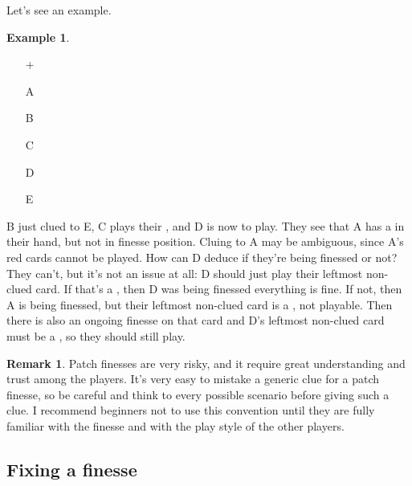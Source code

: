 \documentclass[a4paper]{article}
\theoremstyle{plain}
\theoremstyle{definition}
\newtheorem{remark}[theorem]{Remark}
\newtheorem{example}[theorem]{Example}
\begin{document}
Let's see an example.

\begin{example}	\hfill \\
	\begin{minipage}{0.45\textwidth}
		\begin{itemize}
			\item[\Large +]      
			\item[\Large A]    
			\item[\Large B]    
			\item[\Large C]    
			\item[\Large D]    
			\item[\Large E]    
		\end{itemize}
	\end{minipage}%
	\begin{minipage}{0.55\textwidth}
		B just clued  to E, C plays their , and D is now to play. They see that A has a  in their hand, but not in finesse position. Cluing  to A may be ambiguous, since A's red cards cannot be played. How can D deduce if they're being finessed or not? They can't, but it's not an issue at all: D should just play their leftmost non-clued card. If that's a , then D was being finessed everything is fine. If not, then A is being finessed, but their leftmost non-clued card is a , not playable. Then there is also an ongoing finesse on that card and D's leftmost non-clued card must be a , so they should still play.	
	\end{minipage}
\end{example} \vspace{0.15 cm}

\begin{remark}
	Patch finesses are very risky, and it require great understanding and trust among the players. It's very easy to mistake a generic clue for a patch finesse, so be careful and think to every possible scenario before giving such a clue. I recommend beginners not to use this convention until they are fully familiar with the finesse and with the play style of the other players.
\end{remark}

\subsection{Fixing a finesse}
\end{document}
